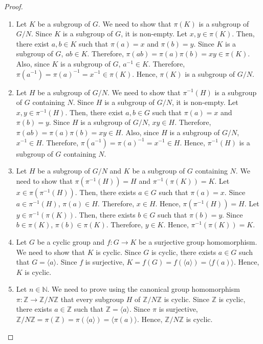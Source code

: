 \documentclass{article}
\begin{document}
\begin{proof}
    \begin{enumerate}
        \item Let $K$ be a subgroup of $G$. We need to show that $\pi(K)$ is a subgroup of $G/N$. Since $K$ is a subgroup of $G$, it is non-empty. Let $x, y \in \pi(K)$. Then, there exist $a, b \in K$ such that $\pi(a) = x$ and $\pi(b) = y$. Since $K$ is a subgroup of $G$, $ab \in K$. Therefore, $\pi(ab) = \pi(a)\pi(b) = xy \in \pi(K)$. Also, since $K$ is a subgroup of $G$, $a^{-1} \in K$. Therefore, $\pi(a^{-1}) = \pi(a)^{-1} = x^{-1} \in \pi(K)$. Hence, $\pi(K)$ is a subgroup of $G/N$.
        \item Let $H$ be a subgroup of $G/N$. We need to show that $\pi^{-1}(H)$ is a subgroup of $G$ containing $N$. Since $H$ is a subgroup of $G/N$, it is non-empty. Let $x, y \in \pi^{-1}(H)$. Then, there exist $a, b \in G$ such that $\pi(a) = x$ and $\pi(b) = y$. Since $H$ is a subgroup of $G/N$, $xy \in H$. Therefore, $\pi(ab) = \pi(a)\pi(b) = xy \in H$. Also, since $H$ is a subgroup of $G/N$, $x^{-1} \in H$. Therefore, $\pi(a^{-1}) = \pi(a)^{-1} = x^{-1} \in H$. Hence, $\pi^{-1}(H)$ is a subgroup of $G$ containing $N$.
        \item Let $H$ be a subgroup of $G/N$ and $K$ be a subgroup of $G$ containing $N$. We need to show that $\pi(\pi^{-1}(H)) = H$ and $\pi^{-1}(\pi(K)) = K$. Let $x \in \pi(\pi^{-1}(H))$. Then, there exists $a \in G$ such that $\pi(a) = x$. Since $a \in \pi^{-1}(H)$, $\pi(a) \in H$. Therefore, $x \in H$. Hence, $\pi(\pi^{-1}(H)) = H$. Let $y \in \pi^{-1}(\pi(K))$. Then, there exists $b \in G$ such that $\pi(b) = y$. Since $b \in \pi(K)$, $\pi(b) \in \pi(K)$. Therefore, $y \in K$. Hence, $\pi^{-1}(\pi(K)) = K$.
        \item Let $G$ be a cyclic group and $f: G \to K$ be a surjective group homomorphism. We need to show that $K$ is cyclic. Since $G$ is cyclic, there exists $a \in G$ such that $G = \langle a \rangle$. Since $f$ is surjective, $K = f(G) = f(\langle a \rangle) = \langle f(a) \rangle$. Hence, $K$ is cyclic.
        \item Let $n \in \mathbb{N}$. We need to prove using the canonical group homomorphism $\pi: \mathbb{Z} \to \mathbb{Z}/N\mathbb{Z}$ that every subgroup $H$ of $\mathbb{Z}/N\mathbb{Z}$ is cyclic. Since $\mathbb{Z}$ is cyclic, there exists $a \in \mathbb{Z}$ such that $\mathbb{Z} = \langle a \rangle$. Since $\pi$ is surjective, $\mathbb{Z}/N\mathbb{Z} = \pi(\mathbb{Z}) = \pi(\langle a \rangle) = \langle \pi(a) \rangle$. Hence, $\mathbb{Z}/N\mathbb{Z}$ is cyclic.
        
    \end{enumerate}
\end{proof}
\end{document}
